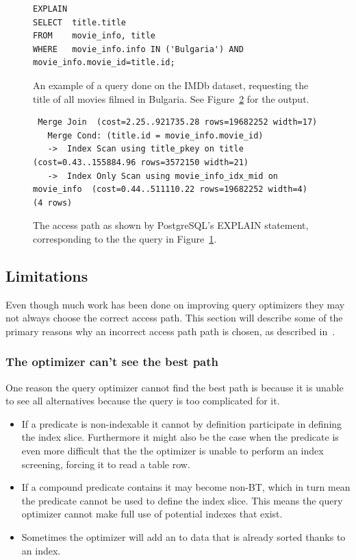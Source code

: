 \begin{figure}[ht]
\begin{verbatim}
EXPLAIN
SELECT  title.title
FROM    movie_info, title
WHERE   movie_info.info IN ('Bulgaria') AND movie_info.movie_id=title.id;
\end{verbatim}
\caption[An example query to ]{An example of a query done on the IMDb dataset, requesting the title of all movies filmed in Bulgaria. See Figure~\ref{fig:sql:explaintrace} for the output.}\label{fig:sql:explainquery}
\end{figure}

\begin{figure}[ht]
\begin{lstlisting}
 Merge Join  (cost=2.25..921735.28 rows=19682252 width=17)
   Merge Cond: (title.id = movie_info.movie_id)
   ->  Index Scan using title_pkey on title  (cost=0.43..155884.96 rows=3572150 width=21)
   ->  Index Only Scan using movie_info_idx_mid on movie_info  (cost=0.44..511110.22 rows=19682252 width=4)
(4 rows)
\end{lstlisting}
\caption[An example of an EXPLAIN trace]{The access path as shown by PostgreSQL's EXPLAIN statement, corresponding to the the query in Figure~\ref{fig:sql:explainquery}.}\label{fig:sql:explaintrace}
\end{figure}

\subsection{Limitations}
Even though much work has been done on improving query optimizers they may not always choose the correct access path. This section will describe some of the primary reasons why an incorrect access path path is chosen, as described in~\cite[Ch. 14]{lahdenmaki_2005_relational_rdidatodossea}.

\subsubsection{The optimizer can't see the best path}
One reason the query optimizer cannot find the best path is because it is unable to see all alternatives because the query is too complicated for it.

\begin{itemize}
    \item If a predicate is non-indexable it cannot by definition participate in defining the index slice. Furthermore it might also be the case when the predicate is even more difficult that the the optimizer is unable to perform an index screening, forcing it to read a table row.
    \item If a compound predicate contains  it may become non-BT, which in turn mean the predicate cannot be used to define the index slice. This means the query optimizer cannot make full use of potential indexes that exist.
    \item Sometimes the optimizer will add an  to data that is already sorted thanks to an index.
\end{itemize}

